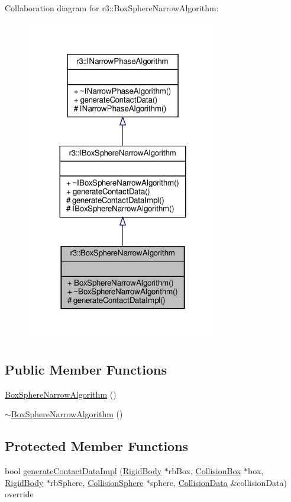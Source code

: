 Collaboration diagram for r3\+:\+:Box\+Sphere\+Narrow\+Algorithm\+:\nopagebreak
\begin{figure}[H]
\begin{center}
\leavevmode
\includegraphics[width=239pt]{classr3_1_1_box_sphere_narrow_algorithm__coll__graph}
\end{center}
\end{figure}
\subsection*{Public Member Functions}
\begin{DoxyCompactItemize}
\item 
\mbox{\hyperlink{classr3_1_1_box_sphere_narrow_algorithm_a0184c33ce7da891240781ad7c78bd9a2}{Box\+Sphere\+Narrow\+Algorithm}} ()
\item 
\mbox{\hyperlink{classr3_1_1_box_sphere_narrow_algorithm_ab00e17b38da83e9a159aa7786a7a1f95}{$\sim$\+Box\+Sphere\+Narrow\+Algorithm}} ()
\end{DoxyCompactItemize}
\subsection*{Protected Member Functions}
\begin{DoxyCompactItemize}
\item 
bool \mbox{\hyperlink{classr3_1_1_box_sphere_narrow_algorithm_a2fc345fdec27e85f0e569afa0d500865}{generate\+Contact\+Data\+Impl}} (\mbox{\hyperlink{classr3_1_1_rigid_body}{Rigid\+Body}} $\ast$rb\+Box, \mbox{\hyperlink{classr3_1_1_collision_box}{Collision\+Box}} $\ast$box, \mbox{\hyperlink{classr3_1_1_rigid_body}{Rigid\+Body}} $\ast$rb\+Sphere, \mbox{\hyperlink{classr3_1_1_collision_sphere}{Collision\+Sphere}} $\ast$sphere, \mbox{\hyperlink{classr3_1_1_collision_data}{Collision\+Data}} \&collision\+Data) override
\end{DoxyCompactItemize}


